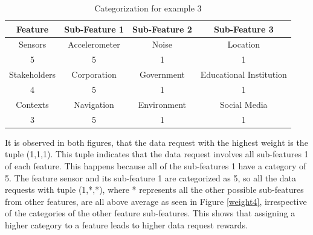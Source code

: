 \begin{table}[h!]
  \centering
  \caption{Categorization for example 3}
  \label{tab:scenario4}
  \begin{tabular}{cccc}
    \toprule
    Feature & Sub-Feature 1 & Sub-Feature 2 & Sub-Feature 3\\
    \midrule
    Sensors & Accelerometer & Noise & Location\\
     5 & 5 & 1 & 1\\ \hhline{====}
     Stakeholders & Corporation & Government & Educational Institution\\
     4 & 5 & 1 & 1\\ \hhline{====}
     Contexts & Navigation & Environment & Social Media\\
     3 & 5 & 1 & 1\\ 
    \bottomrule
  \end{tabular}
\end{table}

It is observed in both figures, that the data request with the highest weight is the tuple (1,1,1). This tuple indicates that the data request involves all sub-features 1 of each feature. This happens because all of the sub-features 1 have a category of 5. The feature sensor and its sub-feature 1 are categorized as 5, so all the data requests
with tuple (1,*,*), where * represents all the other possible sub-features from other features, are all above average as seen in Figure \ref{weight4}, irrespective of the categories of the other feature sub-features. This shows that assigning a higher category to a feature leads to higher data request rewards. 



%

